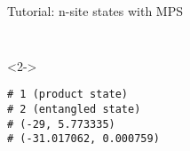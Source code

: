\begin{frame}[fragile]{Tutorial: n-site states with MPS}
\begin{columns}
\begin{column}{4.5cm}
\begin{onlyenv}
\begin{lstlisting}[style=julia, numbers=none, mathescape, basicstyle=\small]
 \end{lstlisting}

\end{onlyenv}

\begin{onlyenv}<2->

\begin{lstlisting}[style=julia, numbers=none, mathescape, basicstyle=\small]
# 1 (product state)
# 2 (entangled state)
# (-29, 5.773335)
# (-31.017062, 0.000759)
\end{lstlisting}

\end{onlyenv}

\end{column}

\end{columns}

\end{frame}
